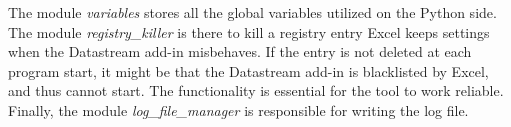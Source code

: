 The module \textit{variables} stores all the global variables utilized on the Python side. The module \textit{registry\_killer} is there to kill a registry entry Excel keeps settings when the Datastream add-in misbehaves. If the entry is not deleted at each program start, it might be that the Datastream add-in is blacklisted by Excel, and thus cannot start. The functionality is essential for the tool to work reliable. Finally, the module \textit{log\_file\_manager} is responsible for writing the log file. 

%






